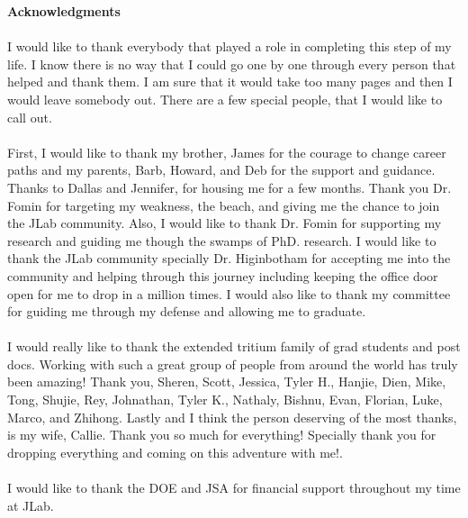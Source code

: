 \begin{center}
	{\large \textbf{Acknowledgments}}\\
\end{center}

\paragraph{}I would like to thank everybody that played a role in completing this step of my life. I know there is no way that I could go one by one through every person that helped and thank them. I am sure that it would take too many pages and then I would leave somebody out. There are a few special people, that I would like to call out. 
\paragraph{}First, I would like to thank my brother, James for the courage to change career paths and my parents, Barb, Howard, and Deb for the support and guidance. Thanks to Dallas and Jennifer, for housing me for a few months. Thank you Dr. Fomin for targeting my weakness, the beach, and giving me the chance to join the JLab community. Also, I would like to thank Dr. Fomin for supporting my research and guiding me though the swamps of PhD. research. I would like to thank the JLab community specially Dr. Higinbotham for accepting me into the community and helping through this journey including keeping the office door open for me to drop in a million times. I would also like to thank my committee for guiding me through my defense and allowing me to graduate. 
\paragraph{}I would really like to thank the extended tritium family of grad students and post docs. Working with such a great group of people from around the world has truly been amazing! Thank you, Sheren, Scott, Jessica, Tyler H., Hanjie, Dien, Mike, Tong, Shujie, Rey, Johnathan, Tyler K., Nathaly, Bishnu, Evan, Florian, Luke, Marco, and Zhihong. Lastly and I think the person deserving of the most thanks, is my wife, Callie. Thank you so much for everything! Specially thank you for dropping everything and coming on this adventure with me!.

\paragraph{}I would like to thank the DOE and JSA for financial support throughout my time at JLab. 